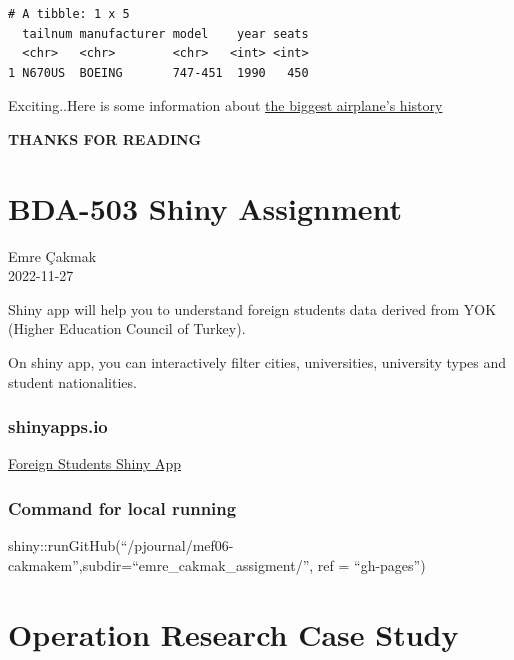 \documentclass[
  letterpaper,
  DIV=11,
  numbers=noendperiod]{scrreprt}
\begin{document}
\begin{verbatim}
# A tibble: 1 x 5
  tailnum manufacturer model    year seats
  <chr>   <chr>        <chr>   <int> <int>
1 N670US  BOEING       747-451  1990   450
\end{verbatim}

Exciting..Here is some information about
\href{https://www.planespotters.net/airframe/boeing-747-400-n670us-delta-air-lines/3wno03}{the
biggest airplane's history}

\textbf{THANKS FOR READING}


\hypertarget{bda-503-shiny-assignment}{%
\chapter{BDA-503 Shiny Assignment}\label{bda-503-shiny-assignment}}

Emre Çakmak\\
2022-11-27

\hfill\break

Shiny app will help you to understand foreign students data derived from
YOK (Higher Education Council of Turkey).

On shiny app, you can interactively filter cities, universities,
university types and student nationalities.

\hypertarget{shinyapps.io}{%
\subsection{shinyapps.io}\label{shinyapps.io}}

\href{https://emre-cakmak.shinyapps.io/emre_cakmak_assigment/}{Foreign
Students Shiny App}

\hypertarget{command-for-local-running}{%
\subsection{Command for local running}\label{command-for-local-running}}

shiny::runGitHub(``/pjournal/mef06-cakmakem'',subdir=``emre\_cakmak\_assigment/'',
ref = ``gh-pages'')


\hypertarget{operation-research-case-study}{%
\chapter{Operation Research Case
Study}\label{operation-research-case-study}}
\end{document}
